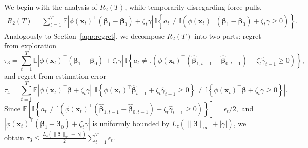 \documentclass[12pt]{article}
\begin{document}
\noindent
We begin with the analysis of $R_2(T)$, while temporarily disregarding force pulls. 
\begin{align*}
    R_2(T) = \sum_{t=1}^{T} \mathbb{E} \left|\phi(\bm{x}_t)^{\top} (\bm{\beta}_1 - \bm{\beta}_0) + \zeta_t \gamma \right| \, \mathbb{I} \left\{ a_t \neq \mathbb{I} \left(\phi(\bm{x}_t)^{\top} (\bm{\beta}_1 - \bm{\beta}_0) + \zeta_t \gamma \ge 0 \right) \right\}.
\end{align*}
Analogously to Section~\ref{app:regret}, we decompose $R_2(T)$ into two parts: regret from exploration
\begin{equation*}
    \tau_3 = \sum_{t=1}^{T} \mathbb{E} \left|\phi(\bm{x}_t)^{\top} (\bm{\beta}_1 - \bm{\beta}_0) + \zeta_t \gamma \right| \, \mathbb{I} \left\{ a_t \neq \mathbb{I} \left(\phi(\bm{x}_t)^{\top} (\widehat{\bm{\beta}}_{1,t-1} - \widehat{\bm{\beta}}_{0,t-1}) + \zeta_t \widehat{\gamma}_{t-1} \ge 0 \right) \right\},
\end{equation*}
and regret from estimation error
\begin{equation*}
    \tau_4 = \sum_{t=1}^{T} \mathbb{E} \left|\phi(\bm{x}_t)^{\top} \bm{\beta} + \zeta_t \gamma \right| \, \left|\mathbb{I} \left\{\phi(\bm{x}_t)^{\top} \widehat{\bm{\beta}}_{t-1} + \zeta_t \widehat{\gamma}_{t-1} \ge 0 \right\}\neq \mathbb{I} \left\{\phi(\bm{x}_t)^{\top} \bm{\beta} + \zeta_t \gamma \ge 0 \right\} \right|.
\end{equation*}
Since
$
\mathbb{E} \!\left[ \mathbb{I} \!\left\{ a_t \neq 
\mathbb{I} \!\left(\phi(\bm{x}_t)^{\top} (\widehat{\bm{\beta}}_{1,t-1} - \widehat{\bm{\beta}}_{0,t-1}) + \zeta_t \widehat{\gamma}_{t-1} \ge 0 \right) \right\} \right] 
= {\epsilon_t}/{2}, $ 
and $\left|\phi(\bm{x}_t)^{\top} (\bm{\beta}_1 - \bm{\beta}_0) + \zeta_t \gamma \right|$ is uniformly bounded by 
$L_z(\|\bm{\beta}\|_\infty + |\gamma|)$, we obtain $\tau_3 \le \frac{L_z(\|\bm{\beta}\|_\infty + |\gamma|)}{2} \sum_{t=1}^T \epsilon_t$.
\end{document}
